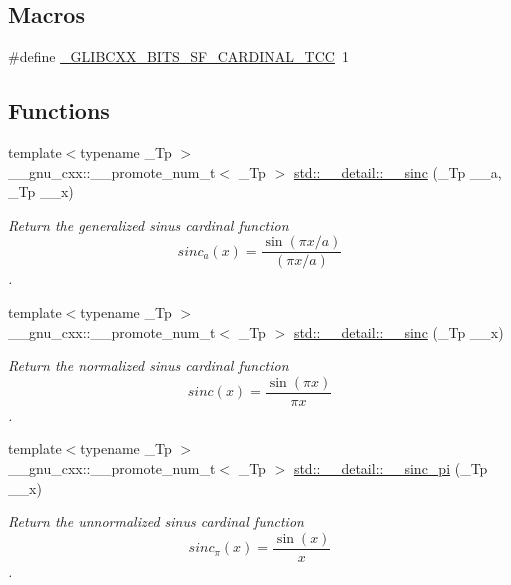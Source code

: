 \subsection*{Macros}
\begin{DoxyCompactItemize}
\item 
\#define \hyperlink{sf__cardinal_8tcc_a1e9bb8201f62b2303ba941ea920790b6}{\+\_\+\+G\+L\+I\+B\+C\+X\+X\+\_\+\+B\+I\+T\+S\+\_\+\+S\+F\+\_\+\+C\+A\+R\+D\+I\+N\+A\+L\+\_\+\+T\+CC}~1
\end{DoxyCompactItemize}
\subsection*{Functions}
\begin{DoxyCompactItemize}
\item 
{\footnotesize template$<$typename \+\_\+\+Tp $>$ }\\\+\_\+\+\_\+gnu\+\_\+cxx\+::\+\_\+\+\_\+promote\+\_\+num\+\_\+t$<$ \+\_\+\+Tp $>$ \hyperlink{namespacestd_1_1____detail_a9e41dd3ccf80f2ae7d97884a05d1e655}{std\+::\+\_\+\+\_\+detail\+::\+\_\+\+\_\+sinc} (\+\_\+\+Tp \+\_\+\+\_\+a, \+\_\+\+Tp \+\_\+\+\_\+x)
\begin{DoxyCompactList}\small\item\em Return the generalized sinus cardinal function \[ sinc_a(x) = \frac{\sin(\pi x / a)}{(\pi x / a)} \]. \end{DoxyCompactList}\item 
{\footnotesize template$<$typename \+\_\+\+Tp $>$ }\\\+\_\+\+\_\+gnu\+\_\+cxx\+::\+\_\+\+\_\+promote\+\_\+num\+\_\+t$<$ \+\_\+\+Tp $>$ \hyperlink{namespacestd_1_1____detail_a9f8f6825e93d90df952c350d56b6a6c7}{std\+::\+\_\+\+\_\+detail\+::\+\_\+\+\_\+sinc} (\+\_\+\+Tp \+\_\+\+\_\+x)
\begin{DoxyCompactList}\small\item\em Return the normalized sinus cardinal function \[ sinc(x) = \frac{\sin(\pi x)}{\pi x} \]. \end{DoxyCompactList}\item 
{\footnotesize template$<$typename \+\_\+\+Tp $>$ }\\\+\_\+\+\_\+gnu\+\_\+cxx\+::\+\_\+\+\_\+promote\+\_\+num\+\_\+t$<$ \+\_\+\+Tp $>$ \hyperlink{namespacestd_1_1____detail_ae4c7989f431b5f7f0e972d4ebd2c6d55}{std\+::\+\_\+\+\_\+detail\+::\+\_\+\+\_\+sinc\+\_\+pi} (\+\_\+\+Tp \+\_\+\+\_\+x)
\begin{DoxyCompactList}\small\item\em Return the unnormalized sinus cardinal function \[ sinc_\pi(x) = \frac{\sin(x)}{x} \]. \end{DoxyCompactList}\item 

\end{DoxyCompactItemize}
